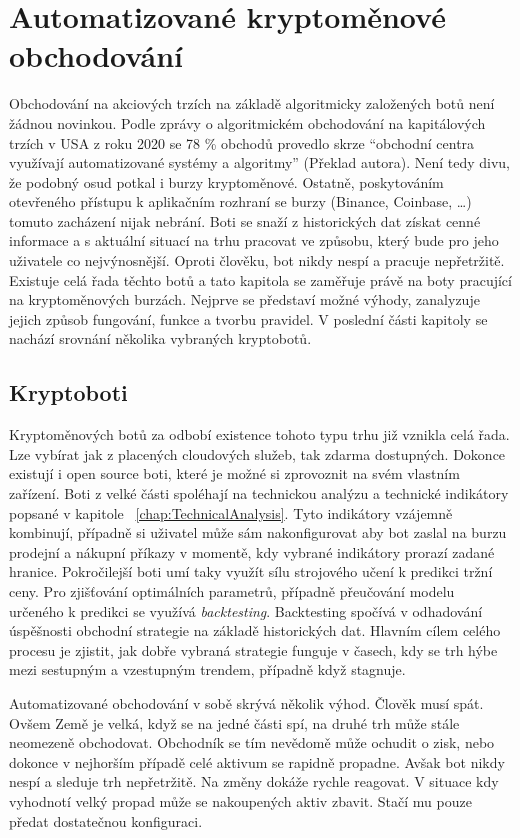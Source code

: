 \chapter{Automatizované kryptoměnové obchodování}
\label{chap:Cryptobots}
Obchodování na akciových trzích na základě algoritmicky založených botů není žádnou novinkou. Podle zprávy o algoritmickém obchodování na kapitálových trzích v USA z roku 2020
\cite{us-algorithmic-trading-report}
se 78 \% obchodů provedlo skrze \enquote{obchodní centra využívají automatizované systémy a algoritmy} (Překlad autora). Není tedy divu, že podobný osud potkal i burzy
kryptoměnové. Ostatně, poskytováním otevřeného přístupu k aplikačním rozhraní se burzy (Binance, Coinbase, \ldots) tomuto zacházení nijak nebrání. Boti se snaží z historických
dat získat cenné informace a s aktuální situací na trhu pracovat ve způsobu, který bude pro jeho uživatele co nejvýnosnější. Oproti člověku, bot nikdy nespí a pracuje
nepřetržitě. Existuje celá řada těchto botů a tato kapitola se zaměřuje právě na boty pracující na kryptoměnových burzách. Nejprve se představí možné výhody,
zanalyzuje jejich způsob fungování, funkce a tvorbu pravidel. V poslední části kapitoly se nachází srovnání několika vybraných kryptobotů.

\section{Kryptoboti}
Kryptoměnových botů za odbobí existence tohoto typu trhu již vznikla celá řada. Lze vybírat jak z placených cloudových služeb, tak zdarma dostupných. Dokonce existují i open
source boti, které je možné si zprovoznit na svém vlastním zařízení. Boti z velké části spoléhají na technickou analýzu a technické indikátory popsané v kapitole
~\ref{chap:TechnicalAnalysis}.
Tyto indikátory vzájemně kombinují, případně si uživatel může sám nakonfigurovat aby bot zaslal na burzu prodejní a nákupní příkazy v momentě, kdy vybrané indikátory
prorazí zadané hranice. Pokročilejší boti umí taky využít sílu strojového učení k predikci tržní ceny. Pro zjišťování optimálních parametrů, případně přeučování modelu
určeného k predikci se využívá \emph{backtesting}. Backtesting spočívá v odhadování úspěšnosti obchodní strategie na základě historických dat. Hlavním cílem celého procesu
je zjistit, jak dobře vybraná strategie funguje v časech, kdy se trh hýbe mezi sestupným a vzestupným trendem, případně když stagnuje.

Automatizované obchodování v sobě skrývá několik výhod. Člověk musí spát. Ovšem Země je velká, když se na jedné části spí, na druhé trh může stále neomezeně obchodovat.
Obchodník se tím nevědomě může ochudit o zisk, nebo dokonce v nejhorším případě celé aktivum se rapidně propadne. Avšak bot nikdy nespí a sleduje trh nepřetržitě. Na změny
dokáže rychle reagovat. V situace kdy vyhodnotí velký propad může se nakoupených aktiv zbavit. Stačí mu pouze předat dostatečnou konfiguraci.

